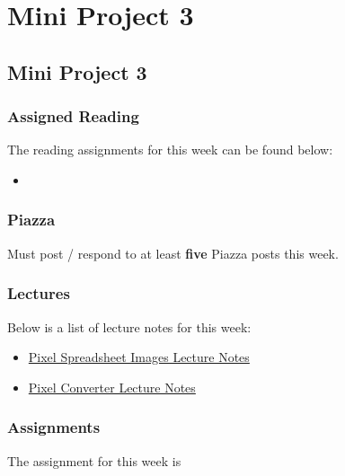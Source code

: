 \clearpage

\renewcommand{\ChapTitle}{Mini Project 3}
\renewcommand{\SectionTitle}{Mini Project 3}

\chapter{\ChapTitle}
\section{\SectionTitle}

\subsection{Assigned Reading}

The reading assignments for this week can be found below:

\begin{itemize}
    \item {}
\end{itemize}

\subsection{Piazza}

Must post / respond to at least \textbf{five} Piazza posts this week.  

\subsection{Lectures}

\noindent Below is a list of lecture notes for this week:

\begin{itemize}
    \item \href{https://drive.google.com/drive/u/2/folders/1l_JWvAp1gkHM8J09HDKTnmJ_2JoEXgG7}{Pixel Spreadsheet Images Lecture Notes}
    \item \href{https://think-maths.co.uk/spreadsheet/}{Pixel Converter Lecture Notes}
\end{itemize}

\subsection{Assignments}

The assignment for this week is   